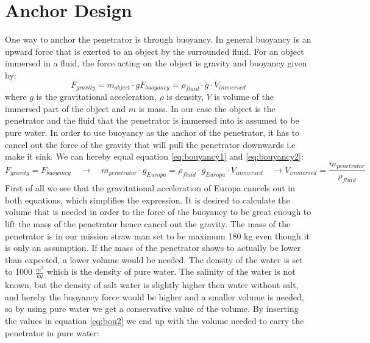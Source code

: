\section{Anchor Design}
One way to anchor the penetrator is through buoyancy. In general buoyancy is an upward force that is exerted to an object by the surrounded fluid. For an object immersed in a fluid, the force acting on the object is gravity and buoyancy given by:
\begin{subequations}
\begin{equation}\label{eq:bouyancy1}
F_{gravity} = m_{object} \cdot g
\end{equation}
\begin{equation} \label{eq:bouyancy2}
F_{buoyancy} = \rho_{fluid}\cdot g \cdot V_{immersed} 
\end{equation}
\end{subequations}
where $g$ is the gravitational acceleration, $\rho$ is density, $V$ is volume of the immersed part of the object and $m$ is mass.  In our case the object is the penetrator and the fluid that the penetrator is immersed into is assumed to be pure water. In order to use buoyancy as the anchor of the penetrator, it has to cancel out the force of the gravity that will pull the penetrator downwards i.e make it sink. We can hereby equal equation \ref{eq:bouyancy1} and \ref{eq:bouyancy2}:
\begin{subequations}
\begin{equation*}\label{eq:bou1}
F_{gravity} = F_{buoyancy} \quad \rightarrow \quad m_{penetrator}\cdot g_{Europa} = \rho_{fluid}\cdot g_{Europa} \cdot V_{immersed}   \quad \rightarrow 
\end{equation*}
\begin{equation} \label{eq:bou2}
V_{immersed} = \frac{m_{penetrator}}{\rho_{fluid}}
\end{equation}
\end{subequations}
First of all we see that the gravitational acceleration of Europa cancels out in both equations, which simplifies the expression. It is desired to calculate the volume that is needed in order to the force of the buoyancy to be great enough to lift the mass of the penetrator hence cancel out the gravity. The mass of the penetrator is in our mission straw man set to be maximum 180 kg even though it is only an assumption. If the mass of the penetrator shows to actually be lower than expected, a lower volume would be needed. The density of the water is set to 1000 $\frac{m^3}{kg}$ which is the density of pure water. The salinity of the water is not known, but the density of salt water is slightly higher then water without salt, and hereby the buoyancy force would be higher and a smaller volume is needed, so by using pure water we get a conservative value of the volume. By inserting the values in equation \ref{eq:bou2} we end up with the volume needed to carry the penetrator in pure water:

